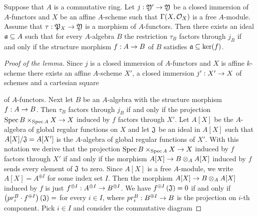 \begin{lemma}\label{lemma:for_affine_local_factorization}
Suppose that $A$ is a commutative ring. Let $j:{\mathfrak Y}'\rightarrow {\mathfrak Y}$ be a closed immersion of $A$-functors and $X$ be an affine $A$-scheme such that $\Gamma(X,{\mathcal O}_X)$ is a free $A$-module. Assume that $\tau:{\mathfrak P}_X\rightarrow {\mathfrak Y}$ is a morphism of $A$-functors. Then there exists an ideal $\mathfrak{a}\subseteq A$ such that for every $A$-algebra $B$ the restriction $\tau_B$ factors through $j_B$ if and only if the structure morphism $f:A\rightarrow B$ of $B$ satisfies $\mathfrak{a}\subseteq \ker(f)$.
\end{lemma}
\begin{proof}[Proof of the lemma]
Since $j$ is a closed immersion of $A$-functors and $X$ is affine $k$-scheme there exists an affine $A$-scheme $X'$, a closed immersion $j':X'\rightarrow X$ of schemes and a cartesian square
\begin{center}
\end{center}
of $A$-functors. Next let $B$ be an $A$-algebra with the structure morphism $f:A\rightarrow B$. Then $\tau_B$ factors through $j_B$ if and only if the projection $\mathrm{Spec}\, B\times_{\mathrm{Spec}\, A}X\rightarrow X$ induced by $f$ factors through $X'$. Let $A[X]$ be the $A$-algebra of global regular functions on $X$ and let $\mathfrak{J}$ be an ideal in $A[X]$ such that $A[X]/\mathfrak{J} = A[X']$ is the $A$-algebra of global regular functions of $X'$. With this notation we derive that the projection $\mathrm{Spec}\, B\times_{\mathrm{Spec}\, A}X\rightarrow X$ induced by $f$ factors through $X'$ if and only if the morphism $A[X]\rightarrow B\otimes_AA[X]$ induced by $f$ sends every element of $\mathfrak{J}$ to zero. Since $A[X]$ is a free $A$-module, we write $A[X] = A^{\oplus I}$ for some index set $I$. Then the morphism $A[X]\rightarrow B\otimes_AA[X]$ induced by $f$ is just $f^{\oplus I}:A^{\oplus I}\rightarrow B^{\oplus I}$. We have $f^{\oplus I}\left(\mathfrak{J}\right)=0$ if and only if $\left(pr^B_i\cdot f^{\oplus I}\right)\left(\mathfrak{J}\right)=$ for every $i\in I$, where $pr^B_i:B^{\oplus I}\rightarrow B$ is the projection on $i$-th component. Pick $i\in I$ and consider the commutative diagram

\end{proof}
